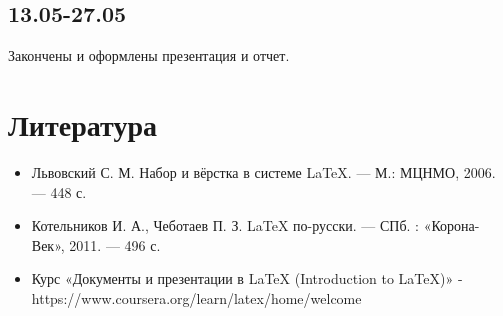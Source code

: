 \documentclass{article}
\begin{document}
	\subsection*{13.05-27.05}
	
	Закончены и оформлены презентация и отчет. 
	
	\section{Литература}
	
	\begin{itemize}
		\item Львовский С. М. Набор и вёрстка в системе LaTeX. — М.: МЦНМО,
		 2006. — 448 с.
		 \item Котельников И. А., Чеботаев П. З. LaTeX по-русски. — СПб. : «Корона-Век», 2011. — 496 с.
		 \item Курс «Документы и презентации в LaTeX (Introduction to LaTeX)» - https://www.coursera.org/learn/latex/home/welcome
	\end{itemize}
\end{document}
